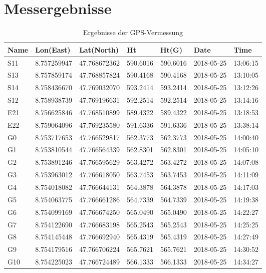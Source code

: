 \section{Messergebnisse}

\begin{table}[!ht]
\centering
\caption{Ergebnisse der GPS-Vermessung}
\label{tab:gps1}
\begin{tabular}{lllllll}
\toprule
Name    & Lon(East)   & Lat(North)   & Ht       & Ht(G)    & Date       & Time     \\
\midrule
S11     & 8.757259947 & 47.768672362 & 590.6016 & 590.6016 & 2018-05-25 & 13:06:15 \\
S13     & 8.757859174 & 47.768857824 & 590.4168 & 590.4168 & 2018-05-25 & 13:10:05 \\
S14     & 8.758436670 & 47.769032070 & 593.2414 & 593.2414 & 2018-05-25 & 13:12:26 \\
S12     & 8.758938739 & 47.769196631 & 592.2514 & 592.2514 & 2018-05-25 & 13:14:16 \\
E21     & 8.756625846 & 47.768510899 & 589.4322 & 589.4322 & 2018-05-25 & 13:18:53 \\
E22     & 8.759064096 & 47.769235580 & 591.6336 & 591.6336 & 2018-05-25 & 13:38:14 \\
G0      & 8.753717653 & 47.766529817 & 562.3773 & 562.3773 & 2018-05-25 & 14:00:40 \\
G1      & 8.753810544 & 47.766564339 & 562.8301 & 562.8301 & 2018-05-25 & 14:05:10 \\
G2      & 8.753891246 & 47.766595629 & 563.4272 & 563.4272 & 2018-05-25 & 14:07:08 \\
G3      & 8.753963012 & 47.766618050 & 563.7453 & 563.7453 & 2018-05-25 & 14:11:09 \\
G4      & 8.754018082 & 47.766644131 & 564.3878 & 564.3878 & 2018-05-25 & 14:17:03 \\
G5      & 8.754063775 & 47.766661286 & 564.7339 & 564.7339 & 2018-05-25 & 14:19:38 \\
G6      & 8.754099169 & 47.766674250 & 565.0490 & 565.0490 & 2018-05-25 & 14:22:27 \\
G7      & 8.754122690 & 47.766683198 & 565.2543 & 565.2543 & 2018-05-25 & 14:25:25 \\
G8      & 8.754145448 & 47.766692940 & 565.4319 & 565.4319 & 2018-05-25 & 14:27:49 \\
G9      & 8.754179516 & 47.766706224 & 565.7621 & 565.7621 & 2018-05-25 & 14:30:52 \\
G10     & 8.754225023 & 47.766724489 & 566.1333 & 566.1333 & 2018-05-25 & 14:34:27 \\

\end{tabular}
\end{table}
